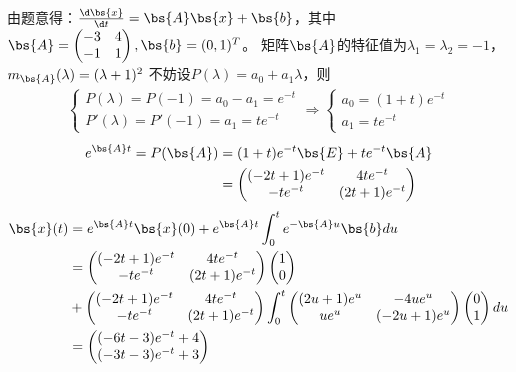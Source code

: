 \documentclass[12pt, a4paper, oneside, UTF8]{ctexbook}
\begin{document}
\begin{solution}
    由题意得：$\frac{\d \bs{x}}{\d t}=\bs{A}\bs{x}+\bs{b}$，其中$\bs{A}=\begin{pmatrix}
        -3&4\\
        -1&1
    \end{pmatrix},\bs{b}=(0,1)^T$。
    矩阵$\bs{A}$的特征值为$\lambda_1=\lambda_2=-1$，$m_{\bs{A}}(\lambda)=(\lambda+1)^2$
    不妨设$P(\lambda)=a_0+a_1\lambda$，则 \begin{align*}
        \left\{
            \begin{array}{ll}
                P(\lambda)=P(-1)=a_0-a_1=e^{-t}\\
                P'(\lambda)=P'(-1)=a_1=te^{-t}
            \end{array}
            \right.
        \Rightarrow
        \left\{
            \begin{array}{ll}
                a_0=(1+t)e^{-t}\\
                a_1=te^{-t}
            \end{array}
            \right.
    \end{align*}
    \begin{align*}
        e^{\bs{A}t}=P(\bs{A})
    &=(1+t)e^{-t}\bs{E}+te^{-t}\bs{A}\\
    &=\begin{pmatrix}
        (-2t+1)e^{-t} &4te^{-t} \\
        -te^{-t}  & (2t+1)e^{-t}
    \end{pmatrix}
    \end{align*}
    \begin{align*}
        \bs{x}(t)&=e^{\bs{A}t}\bs{x}(0)+e^{\bs{A}t}\int_{0}^t e^{-\bs{A}u}\bs{b} du\\
        &=\begin{pmatrix}
            (-2t+1)e^{-t} &4te^{-t} \\
        -te^{-t}  & (2t+1)e^{-t}
        \end{pmatrix}\begin{pmatrix}
            1 \\
            0
        \end{pmatrix}\\
        &+\begin{pmatrix}
            (-2t+1)e^{-t} &4te^{-t} \\
        -te^{-t}  & (2t+1)e^{-t}
        \end{pmatrix}\int_{0}^t 
        \begin{pmatrix}
            (2u+1)e^{u} &-4ue^{u} \\
            ue^{u}  & (-2u+1)e^{u}
        \end{pmatrix} \begin{pmatrix}
            0\\
            1
        \end{pmatrix} du \\
        &=\begin{pmatrix}
            (-6t-3)e^{-t}+4 \\
            (-3t-3)e^{-t}+3
        \end{pmatrix}
        \end{align*}
\end{solution}
\end{document}

